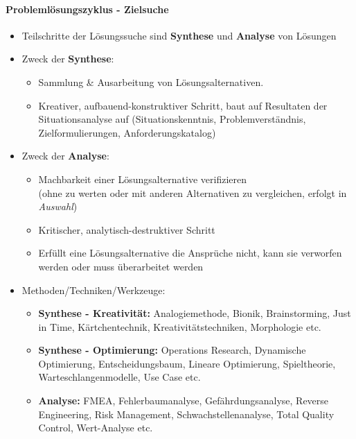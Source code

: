 \documentclass[a4paper]{article}
\begin{document}
\newpage
		
		\paragraph{Problemlösungszyklus - Zielsuche}
		
			\begin{itemize}
				\item Teilschritte der Lösungssuche sind \textbf{Synthese} und \textbf{Analyse} von Lösungen
				\item Zweck der \textbf{Synthese}:
					\begin{itemize}
						\item Sammlung \& Ausarbeitung von Lösungsalternativen.
						\item Kreativer, aufbauend-konstruktiver Schritt, baut auf Resultaten der Situationsanalyse auf (Situationskenntnis, Problemverständnis, Zielformulierungen, Anforderungskatalog)
					\end{itemize}
				\item Zweck der \textbf{Analyse}:
					\begin{itemize}
						\item Machbarkeit einer Lösungsalternative verifizieren\\ 
						(ohne zu werten oder mit anderen Alternativen zu vergleichen, erfolgt in \textit{Auswahl})
						\item Kritischer, analytisch-destruktiver Schritt
						\item Erfüllt eine Lösungsalternative die Ansprüche nicht, kann sie verworfen werden oder muss überarbeitet werden
					\end{itemize}
				\item Methoden/Techniken/Werkzeuge:
					\begin{itemize}
						\item \textbf{Synthese - Kreativität:} Analogiemethode, Bionik, Brainstorming, Just in Time, Kärtchentechnik, Kreativitätstechniken, Morphologie etc.
						\item \textbf{Synthese - Optimierung:} Operations Research, Dynamische Optimierung, Entscheidungsbaum, Lineare Optimierung, Spieltheorie, Warteschlangenmodelle, Use Case etc.
						\item \textbf{Analyse:} FMEA, Fehlerbaumanalyse, Gefährdungsanalyse, Reverse Engineering, Risk Management, Schwachstellenanalyse, Total Quality Control, Wert-Analyse etc.
					\end{itemize}
			\end{itemize}
		
\end{document}
